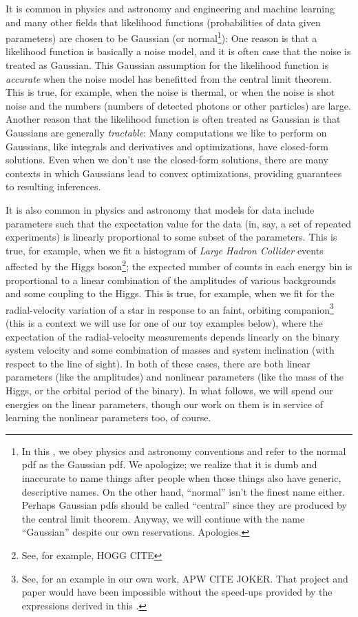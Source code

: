 It is common in physics and astronomy and engineering and machine learning and many other fields that likelihood functions
(probabilities of data given parameters) are chosen to be Gaussian
(or normal\footnote{In this \documentname, we obey physics and astronomy
  conventions and refer to the normal pdf as the Gaussian pdf. We apologize;
  we realize that it is dumb and inaccurate to name things after people when
  those things also have generic, descriptive names.
  On the other hand, ``normal'' isn't the finest
  name either. Perhaps Gaussian pdfs should be called ``central'' since they are
  produced by the central limit theorem. Anyway, we will continue with
  the name ``Gaussian'' despite our own reservations. Apologies.}):
One reason is that a likelihood function is basically a noise model,
and it is often case that the noise is treated as Gaussian.
This Gaussian assumption for the likelihood function is
\emph{accurate} when the noise model has benefitted from the central
limit theorem.
This is true, for example, when the noise is thermal, or when the
noise is shot noise and the numbers (numbers of detected photons or other
particles) are large.
Another reason that the likelihood function is often treated as
Gaussian is that Gaussians are generally \emph{tractable}:
Many computations we like to perform on Gaussians, like integrals and
derivatives and optimizations, have closed-form solutions.
Even when we don't use the closed-form solutions, there are many
contexts in which Gaussians lead to convex optimizations,
providing guarantees to resulting inferences.

It is also common in physics and astronomy that models for data
include parameters such that the expectation value for the data (in,
say, a set of repeated experiments) is linearly proportional to some
subset of the parameters.
This is true, for example, when we fit a histogram of \textsl{Large Hadron Collider}
events
affected by the Higgs boson\footnote{See, for example, HOGG CITE};
the expected number of counts in each
energy bin is proportional to a linear combination of the amplitudes
of various backgrounds and some coupling to the Higgs.
This is true, for example, when we fit for the radial-velocity
variation of a star in response to an faint, orbiting companion\footnote{See,
  for an example in our own work, APW CITE JOKER. That project and paper would have been
  impossible without the speed-ups provided by the expressions derived in this
  \documentname.} (this is a context
we will use for one of our toy examples below), where the expectation of the
radial-velocity measurements depends linearly on the binary system
velocity and some combination of masses and system inclination (with
respect to the line of sight).
In both of these cases, there are both linear parameters (like the
amplitudes) and nonlinear parameters (like the mass of the Higgs, or
the orbital period of the binary).
In what follows, we will spend our energies on the linear parameters,
though our work on them is in service of learning the nonlinear
parameters too, of course.

